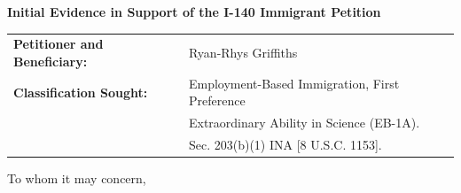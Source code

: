 \documentclass[11pt]{article}
\begin{document}


\pagebreak
\sloppy
\vspace{4em}

\begin{center}
 \Large{\textbf{Initial Evidence in Support of the I-140 Immigrant Petition}}
\end{center}

\vspace{4em}

\begin{tabular}{ll}
\textbf{Petitioner and Beneficiary:} & Ryan-Rhys Griffiths\\
\textbf{Classification Sought:} & Employment-Based Immigration, First Preference\\
& Extraordinary Ability in Science (EB-1A).\\
& Sec. 203(b)(1) INA [8 U.S.C. 1153].\\
\end{tabular}

\vspace{2em}

To whom it may concern,

\vspace{2em}

\newcommand{\fie}{Machine Learning and the Natural Sciences}
\newcommand{\dr}{Dr. Griffiths }
\newcommand{\drs}{Dr. Griffiths's }
\end{document}
